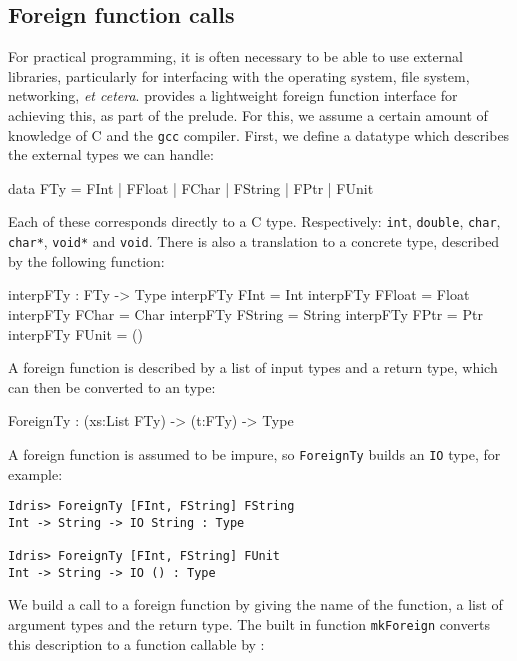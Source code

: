 \subsection{Foreign function calls}

For practical programming, it is often necessary to be able to use external libraries, particularly for interfacing with the operating system, file system, networking, \emph{et cetera}.
\Idris{} provides a lightweight foreign function interface for achieving this, as part of the prelude.
For this, we assume a certain amount of knowledge of C and the \texttt{gcc} compiler.
First, we define a datatype which describes the external types we can handle:

\begin{code}
data FTy = FInt | FFloat | FChar | FString | FPtr | FUnit
\end{code}

\noindent
Each of these corresponds directly to a C type.
Respectively: \texttt{int}, \texttt{double}, \texttt{char}, \texttt{char*}, \texttt{void*} and \texttt{void}.
There is also a translation to a concrete \Idris{} type, described by the following function:

\begin{code}
interpFTy : FTy -> Type
interpFTy FInt    = Int
interpFTy FFloat  = Float
interpFTy FChar   = Char
interpFTy FString = String
interpFTy FPtr    = Ptr
interpFTy FUnit   = ()
\end{code}

\noindent
A foreign function is described by a list of input types and a return type, which can then be converted to an \Idris{} type:

\begin{code}
ForeignTy : (xs:List FTy) -> (t:FTy) -> Type
\end{code}

\noindent
A foreign function is assumed to be impure, so \texttt{ForeignTy} builds an \texttt{IO} type, for example:

\begin{lstlisting}[style=stdout]
Idris> ForeignTy [FInt, FString] FString
Int -> String -> IO String : Type

Idris> ForeignTy [FInt, FString] FUnit 
Int -> String -> IO () : Type
\end{lstlisting}

\noindent
We build a call to a foreign function by giving the name of the function, a list of argument types and the return type.
The built in function \texttt{mkForeign} converts this description to a function callable by \Idris{}:

